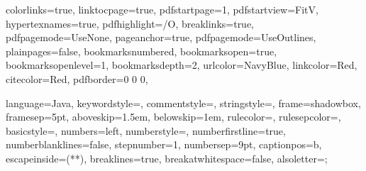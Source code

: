 \graphicspath{{figures/}{../figures/}}

\hypersetup %
{
	colorlinks=true,
	linktocpage=true, 
	pdfstartpage=1,
	pdfstartview=FitV,
	hypertexnames=true,
	pdfhighlight=/O,
	breaklinks=true,
	pdfpagemode=UseNone,
	pageanchor=true,
	pdfpagemode=UseOutlines,
	plainpages=false,
	bookmarksnumbered,
	bookmarksopen=true,
	bookmarksopenlevel=1,
	bookmarksdepth=2,
	urlcolor=NavyBlue,
	linkcolor=Red,
	citecolor=Red,
	pdfborder={0 0 0},
}

\lstset %
{
	language=Java,
	keywordstyle=\color{RoyalBlue},
    commentstyle=\color{Green}\ttfamily,
    stringstyle=\color{Red}\ttfamily,
	frame=shadowbox,
	framesep=5pt,
	aboveskip=1.5em,
	belowskip=1em,
	rulecolor=\color{blue!40!black},
	rulesepcolor=\color{white!93!black},
	basicstyle=\ttfamily\normalsize,
	numbers=left,
	numberstyle=\tiny,
	numberfirstline=true,
	numberblanklines=false,
	stepnumber=1,
	numbersep=9pt,	
	captionpos=b,
	escapeinside={(*}{*)},
	breaklines=true,
	breakatwhitespace=false,
	alsoletter={;}
}

\usetikzlibrary{positioning,fit,calc,shapes,arrows,external,petri}

